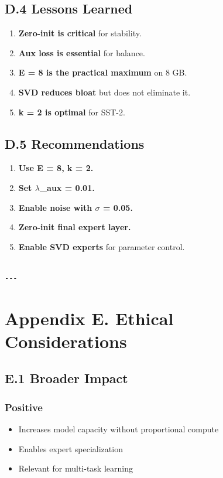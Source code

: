 \subsection{D.4 Lessons Learned}

\begin{enumerate}
\item \textbf{Zero-init is critical} for stability.
\item \textbf{Aux loss is essential} for balance.
\item \textbf{E = 8 is the practical maximum} on 8 GB.
\item \textbf{SVD reduces bloat} but does not eliminate it.
\item \textbf{k = 2 is optimal} for SST-2.

\end{enumerate}
\subsection{D.5 Recommendations}

\begin{enumerate}
\item \textbf{Use E = 8, k = 2.}
\item \textbf{Set $\lambda$\_aux = 0.01.}
\item \textbf{Enable noise with $\sigma$ = 0.05.}
\item \textbf{Zero-init final expert layer.}
\item \textbf{Enable SVD experts} for parameter control.
\end{enumerate}
\begin{lstlisting}

---
\end{lstlisting}

\section{Appendix E. Ethical Considerations}

\subsection{E.1 Broader Impact}

\subsubsection{Positive}
\begin{itemize}
\item Increases model capacity without proportional compute
\item Enables expert specialization
\item Relevant for multi-task learning

\end{itemize}
